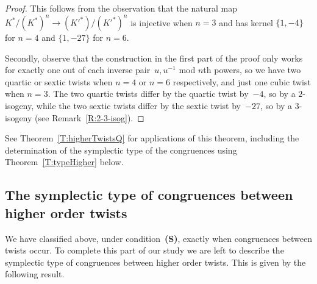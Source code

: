\documentclass[12pt, reqno]{amsart}
\numberwithin{equation}{section}
\theoremstyle{definition}
\theoremstyle{remark}
\begin{document}
\begin{proof}
This follows from the observation that the natural map $K^*/(K^*)^n
\to (K'^*)/(K'^*)^n$ is injective when $n=3$ and has kernel $\{1,-4\}$
for $n=4$ and $\{1,-27\}$ for $n=6$.

Secondly, observe that the construction in the first part of the proof
only works for exactly one out of each inverse pair~$u,u^{-1}$ mod
$n$th powers, so we have two quartic or sextic twists when $n=4$ or
$n=6$ respectively, and just one cubic twist when $n=3$.  The two
quartic twists differ by the quartic twist by~$-4$, so by a
$2$-isogeny, while the two sextic twists differ by the sextic twist
by~$-27$, so by a $3$-isogeny (see Remark~\ref{R:2-3-isog}).
\end{proof}

See Theorem~\ref{T:higherTwistsQ} for applications of this theorem,
including the determination of the symplectic type of the congruences
using Theorem~\ref{T:typeHigher} below.


\subsection{The symplectic type of congruences between higher order twists}
\label{SS:typeHigher}
We have classified above, under condition~{\bf (S)}, exactly when congruences between twists occur. To complete this part of our study we are left to describe the symplectic type of congruences between higher order twists. 
This is given by the following result. 
\end{document}
